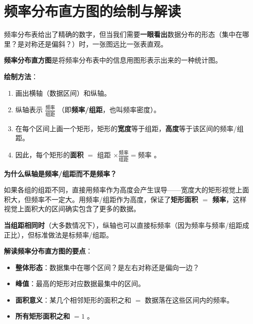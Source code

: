 \section*{频率分布直方图的绘制与解读}


\begin{explore}


频率分布表给出了精确的数字，但当我们需要\textbf{一眼看出}数据分布的形态（集中在哪里？是对称还是偏斜？）时，一张图远比一张表直观。

\end{explore}

\begin{understand}


\textbf{频率分布直方图}是将频率分布表中的信息用图形表示出来的一种统计图。

\textbf{绘制方法}：

\begin{enumerate}
  \item 画出横轴（数据区间）和纵轴。
  \item 纵轴表示 $\frac{\text{频率}}{\text{组距}}$ （即\textbf{频率/组距}，也叫频率密度）。
  \item 在每个区间上画一个矩形，矩形的\textbf{宽度}等于组距，\textbf{高度}等于该区间的频率/组距。
  \item 因此，每个矩形的\textbf{面积} $=$ 组距 $\times \frac{\text{频率}}{\text{组距}} = \text{频率}$ 。
\end{enumerate}


\textbf{为什么纵轴是频率/组距而不是频率？}

如果各组的组距不同，直接用频率作为高度会产生误导——宽度大的矩形视觉上面积大，但频率不一定大。用频率/组距作为高度，保证了\textbf{矩形面积 $=$ 频率}，这样视觉上面积大的区间确实包含了更多的数据。

\textbf{当组距相同时}（大多数情况下），纵轴也可以直接标频率（因为频率与频率/组距成正比），但标准做法是标频率/组距。

\textbf{解读频率分布直方图的要点}：
\begin{itemize}
  \item \textbf{整体形态}：数据集中在哪个区间？是左右对称还是偏向一边？
  \item \textbf{峰值}：最高的矩形对应数据最集中的区间。
  \item \textbf{面积意义}：某几个相邻矩形的面积之和 $=$ 数据落在这些区间内的频率。
  \item \textbf{所有矩形面积之和} $= 1$ 。
\end{itemize}


\end{understand}

